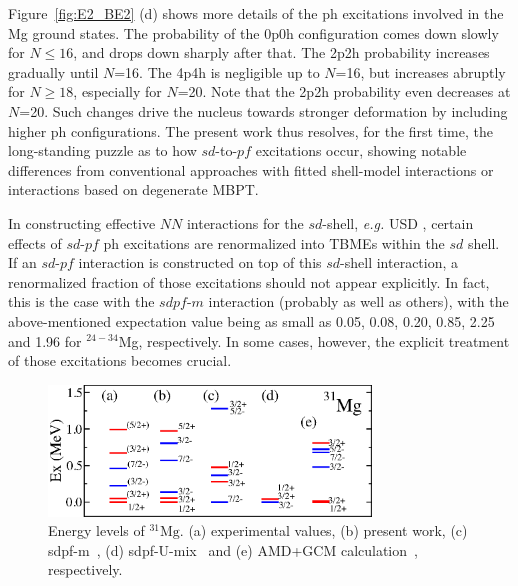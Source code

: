 \documentclass[aps,prl,twocolumn,groupedaddress,showkeys,showpacs,floatfix,superscriptaddress]{revtex4-1}
\def\Nu#1#2#3{{}^{#2}_{#3}\mathrm{#1}}
\newcommand\+{^\dagger}
\begin{document}
Figure~\ref{fig:E2_BE2} (d) shows more details of the ph excitations involved in the Mg 
ground states.  The probability of the 0p0h configuration comes down slowly for $N\le 16$, and drops down
sharply after that.  The 2p2h probability increases gradually until $N$=16.  The 4p4h is negligible 
up to $N$=16, but increases abruptly for $N \ge 18$, especially for $N$=20.  
Note that the 2p2h probability even decreases at $N$=20.  
Such changes drive the nucleus towards stronger deformation  
by including higher ph configurations.   
The present work thus resolves, for the first time, the long-standing puzzle as to how 
$sd$-to-$pf$ excitations occur, showing notable differences from conventional approaches with fitted shell-model interactions or interactions based on degenerate MBPT. 

In constructing effective $NN$ interactions for the $sd$-shell, {\it e.g.} USD \cite{Brown1988191}, 
certain effects of $sd$-$pf$ ph excitations are renormalized  
into TBMEs within the $sd$ shell.  
If an $sd$-$pf$ interaction is constructed on top of this $sd$-shell interaction,  
a renormalized fraction of those excitations should not appear explicitly.    
In fact, this is the case with the $sdpf$-$m$ interaction (probably as well as others), 
with the above-mentioned expectation value 
being as small as 0.05, 0.08, 0.20, 0.85, 2.25 and 1.96 for $^{24-34}$Mg, respectively.
In some cases, however, the explicit treatment of those excitations becomes crucial.  

\begin{figure}[tbp]
 \includegraphics[width=8.5725cm,angle=0,clip]{Fig3.eps}
 \caption{Energy levels of $\Nu{Mg}{31}{}$. (a) experimental values, (b)
 present work, (c) sdpf-m~\cite{PhysRevC.60.054315},
 (d) sdpf-U-mix~\cite{Caurier:2013aoa} and (e)
 AMD+GCM calculation~\cite{Kimura:2007id}, respectively.}
 \label{fig:ant}
\end{figure}
\end{document}
